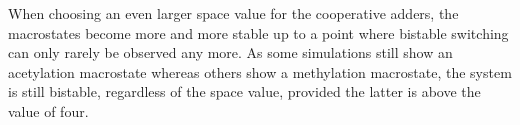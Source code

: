             When choosing an even larger space value for the cooperative adders, the macrostates become more and more stable up to a point where bistable switching can only rarely be observed any more. As some simulations still show an acetylation macrostate whereas others show a methylation macrostate, the system is still bistable, regardless of the space value, provided the latter is above the value of four.
%
%